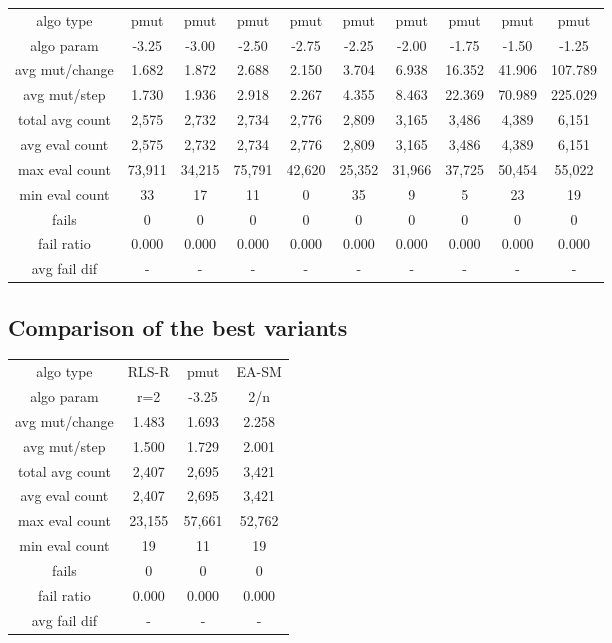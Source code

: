 \begin{tabular}[h]{cccccccccc}
algo type&           pmut&    pmut&    pmut&    pmut&    pmut&    pmut&    pmut&    pmut&    pmut\\
algo param&         -3.25&   -3.00&   -2.50&   -2.75&   -2.25&   -2.00&   -1.75&   -1.50&   -1.25\\
avg mut/change&     1.682&   1.872&   2.688&   2.150&   3.704&   6.938&  16.352&  41.906& 107.789\\
avg mut/step&       1.730&   1.936&   2.918&   2.267&   4.355&   8.463&  22.369&  70.989& 225.029\\
\hline
total avg count&    2,575&   2,732&   2,734&   2,776&   2,809&   3,165&   3,486&   4,389&   6,151\\
avg eval count&     2,575&   2,732&   2,734&   2,776&   2,809&   3,165&   3,486&   4,389&   6,151\\
max eval count&    73,911&  34,215&  75,791&  42,620&  25,352&  31,966&  37,725&  50,454&  55,022\\
min eval count&        33&      17&      11&       0&      35&       9&       5&      23&      19\\
\hline
fails&                  0&       0&       0&       0&       0&       0&       0&       0&       0\\
fail ratio&         0.000&   0.000&   0.000&   0.000&   0.000&   0.000&   0.000&   0.000&   0.000\\
avg fail dif&           -&       -&       -&       -&       -&       -&       -&       -&       -\\
\end{tabular}


\subsection{Comparison of the best variants}


\begin{tabular}[h]{cccc}
algo type&         RLS-R&   pmut&  EA-SM\\
algo param&          r=2&  -3.25&    2/n\\
avg mut/change&    1.483&  1.693&  2.258\\
avg mut/step&      1.500&  1.729&  2.001\\
\hline
total avg count&   2,407&  2,695&  3,421\\
avg eval count&    2,407&  2,695&  3,421\\
max eval count&   23,155& 57,661& 52,762\\
min eval count&       19&     11&     19\\
\hline
fails&                 0&      0&      0\\
fail ratio&        0.000&  0.000&  0.000\\
avg fail dif&          -&      -&      -\\
\end{tabular}

